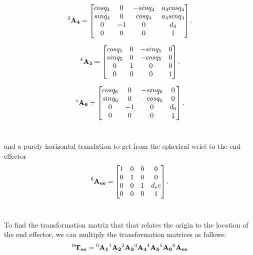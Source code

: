 \documentclass{UoNMCHA}
\numberwithin{equation}{section}
\begin{document}
\begin{equation*}
\mathbf{\prescript{3}{}A_{4}} =
\begin{bmatrix}
cosq_4 & 0 & -sinq_4  & a_4 cosq_4 \\
sinq_4 & 0  & cosq_4  & a_4 sinq_4 \\
0      & -1  & 0  & d_4\\
0 	   & 0	 & 0  & 1
\end{bmatrix}.
\end{equation*}

\begin{equation*}
\mathbf{\prescript{4}{}A_{5}} =
\begin{bmatrix}
cosq_5 & 0 & -sinq_5  & 0 \\
sinq_5 & 0  & -cosq_5  & 0 \\
0      & 1  & 0  & 0\\
0 	   & 0	 & 0  & 1
\end{bmatrix}.
\end{equation*}

\begin{equation*}
\mathbf{\prescript{5}{}A_{6}} =
\begin{bmatrix}
cosq_6 & 0 & -sinq_6  & 0 \\
sinq_6 & 0  & -cosq_6  & 0 \\
0      & -1  & 0  & d_6\\
0 	   & 0	 & 0  & 1
\end{bmatrix}.
\end{equation*}\

and a purely horizontal translation to get from the spherical wrist to the end effector
\begin{equation*}
\mathbf{\prescript{6}{}A_{ee}} =
\begin{bmatrix}
1 & 0 & 0  & 0 \\
0 & 1  & 0  & 0 \\
0      & 0  & 1  & d_ee\\
0 	   & 0	 & 0  & 1
\end{bmatrix}.
\end{equation*}\

To find the transformation matrix that that relates the origin to the location of the end effector, we can
multiply the transformation matrices as follows:\\

\begin{equation}
\mathbf{\prescript{0}{}T_{ee}} = \mathbf{\prescript{0}{}A_{1}}\mathbf{\prescript{1}{}A_{2}}\mathbf{\prescript{2}{}A_{3}}\mathbf{\prescript{3}{}A_{4}}\mathbf{\prescript{4}{}A_{5}}\mathbf{\prescript{5}{}A_{6}}\mathbf{\prescript{6}{}A_{ee}}
\end{equation} 
\end{document}

